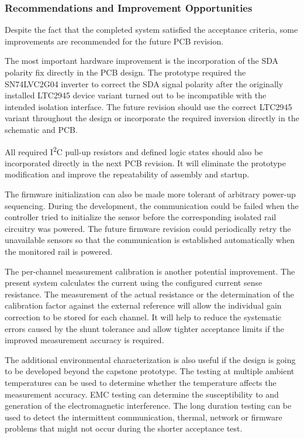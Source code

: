 \subsubsection{Recommendations and Improvement Opportunities}

Despite the fact that the completed system satisfied the acceptance criteria, some improvements are recommended for the future PCB revision.

The most important hardware improvement is the incorporation of the SDA polarity fix directly in the PCB design. The prototype required the SN74LVC2G04 inverter to correct the SDA signal polarity after the originally installed LTC2945 device variant turned out to be incompatible with the intended isolation interface. The future revision should use the correct LTC2945 variant throughout the design or incorporate the required inversion directly in the schematic and PCB.

All required I\textsuperscript{2}C pull-up resistors and defined logic states should also be incorporated directly in the next PCB revision. It will eliminate the prototype modification and improve the repeatability of assembly and startup.

The firmware initialization can also be made more tolerant of arbitrary power-up sequencing. During the development, the communication could be failed when the controller tried to initialize the sensor before the corresponding isolated rail circuitry was powered. The future firmware revision could periodically retry the unavailable sensors so that the communication is established automatically when the monitored rail is powered.

The per-channel measurement calibration is another potential improvement. The present system calculates the current using the configured current sense resistance. The measurement of the actual resistance or the determination of the calibration factor against the external reference will allow the individual gain correction to be stored for each channel. It will help to reduce the systematic errors caused by the shunt tolerance and allow tighter acceptance limits if the improved measurement accuracy is required.

The additional environmental characterization is also useful if the design is going to be developed beyond the capstone prototype. The testing at multiple ambient temperatures can be used to determine whether the temperature affects the measurement accuracy. EMC testing can determine the susceptibility to and generation of the electromagnetic interference. The long duration testing can be used to detect the intermittent communication, thermal, network or firmware problems that might not occur during the shorter acceptance test.

